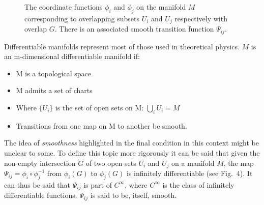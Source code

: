 \documentclass[fleqn, twocolumn, 10pt]{article}
\begin{document}
\begin{figure}[t]
\centering
{}
\caption{The coordinate functions $\phi_i$ and $\phi_j$ on the manifold $M$ corresponding to overlapping subsets $U_i$ and $U_j$ respectively with overlap $G$. There is an associated smooth transition function $\Psi_{ij}$.}
\end{figure}

Differentiable manifolds represent most of those used in theoretical physics. $M$ is an m-dimensional differentiable manifold if:

\begin{itemize}
\item M is a topological space
\item M admits a set of charts
\item Where $\{ U_i\}$ is the set of open sets on M: $\bigcup_iU_i = M$
\item Transitions from one map on M to another be smooth.
\end{itemize}

The idea of \textit{smoothness} highlighted in the final condition in this context might be unclear to some. To define this topic more rigorously it can be said that given the non-empty intersection $G$ of two open sets $U_i$ and $U_j$ on a manifold $M$, the map $\Psi_{ij} = \phi_i \circ \phi_j^{-1}$ from $\phi_i(G)$ to $\phi_j(G)$ is infinitely differentiable (see Fig.~4). It can thus be said that $\Psi_{ij}$ is part of $C^\infty$, where $C^\infty$ is the class of infinitely differentiable functions. $\Psi_{ij}$ is said to be, itself, smooth.
\end{document}
